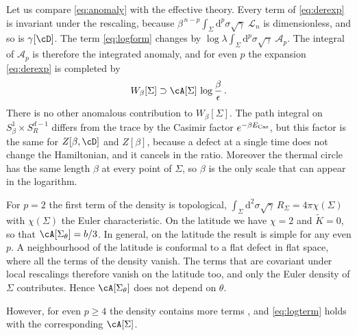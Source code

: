 \documentclass[a4paper,11pt]{article}
\newcommand{\Kt}{\widetilde{K}}
\newcommand{\dd}{\mathrm{d}}
\begin{document}
Let us compare \eqref{eq:anomaly} with the effective theory. Every term of \eqref{eq:derexp} is invariant under the rescaling, because $\beta^{\,n-p}\int_\Sigma\dd^p\sigma\sqrt\gamma\;\mathcal{L}_n$ is dimensionless, and so is $\gamma[\cD]$. The term \eqref{eq:logform} changes by $\log\lambda\int_\Sigma\dd^p\sigma\sqrt\gamma\;\mathcal{A}_p$. The integral of $\mathcal{A}_p$ is therefore the integrated anomaly, and for even $p$ the expansion \eqref{eq:derexp} is completed by
\begin{equation}\label{eq:logterm}
	W_\beta[\Sigma]\supset\cA[\Sigma]\,\log\frac{\beta}{\epsilon} \, .
\end{equation}
There is no other anomalous contribution to $W_\beta[\Sigma]$. The path integral on $S^1_\beta\times S^{d-1}_R$ differs from the trace by the Casimir factor $e^{-\beta E_{\rm Cas}}$, but this factor is the same for $Z[\beta,\cD]$ and $Z[\beta]$, because a defect at a single time does not change the Hamiltonian, and it cancels in the ratio. Moreover the thermal circle has the same length $\beta$ at every point of $\Sigma$, so $\beta$ is the only scale that can appear in the logarithm.

For $p=2$ the first term of the density is topological, $\int_\Sigma\dd^2\sigma\sqrt\gamma\,R_\Sigma=4\pi\chi(\Sigma)$ with $\chi(\Sigma)$ the Euler characteristic. On the latitude we have $\chi=2$ and $\Kt=0$, so that $\cA[\Sigma_\theta]=b/3$. 
In general, on the latitude the result is simple for any even $p$. A neighbourhood of the latitude is conformal to a flat defect in flat space, where all the terms of the density vanish. The terms that are covariant under local rescalings therefore vanish on the latitude too, and only the Euler density of $\Sigma$ contributes. Hence $\cA[\Sigma_\theta]$ does not depend on $\theta$.

However, for even $p\ge4$ the density contains more terms \cite{Chalabi:2021jud}, and \eqref{eq:logterm} holds with the corresponding $\cA[\Sigma]$. 
\end{document}
